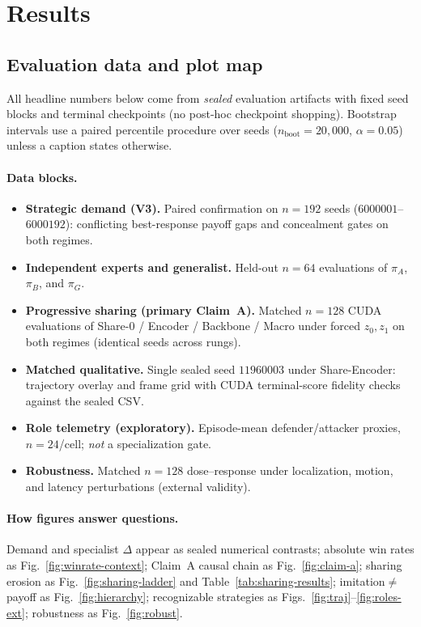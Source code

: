 \documentclass{article}
\begin{document}
\section{Results}
\label{sec:results}

\subsection{Evaluation data and plot map}
\label{sec:results-data}

All headline numbers below come from \emph{sealed} evaluation artifacts with
fixed seed blocks and terminal checkpoints (no post-hoc checkpoint shopping).
Bootstrap intervals use a paired percentile procedure over seeds
($n_{\mathrm{boot}}=20{,}000$, $\alpha=0.05$) unless a caption states otherwise.

\paragraph{Data blocks.}
\begin{itemize}
  \item \textbf{Strategic demand (V3).}
  Paired confirmation on $n{=}192$ seeds
  ($6000001$--$6000192$): conflicting best-response payoff gaps and concealment
  gates on both regimes.
  \item \textbf{Independent experts and generalist.}
  Held-out $n{=}64$ evaluations of $\pi_A$, $\pi_B$, and $\pi_G$.
  \item \textbf{Progressive sharing (primary Claim~A).}
  Matched $n{=}128$ CUDA evaluations of Share-0 / Encoder / Backbone / Macro
  under forced $z_0,z_1$ on both regimes (identical seeds across rungs).
  \item \textbf{Matched qualitative.}
  Single sealed seed $11960003$ under Share-Encoder: trajectory overlay and
  frame grid with CUDA terminal-score fidelity checks against the sealed CSV.
  \item \textbf{Role telemetry (exploratory).}
  Episode-mean defender/attacker proxies, $n{=}24$/cell; \emph{not} a
  specialization gate.
  \item \textbf{Robustness.}
  Matched $n{=}128$ dose--response under localization, motion, and latency
  perturbations (external validity).
\end{itemize}

\paragraph{How figures answer questions.}
Demand and specialist $\Delta$ appear as sealed numerical contrasts; absolute
win rates as Fig.~\ref{fig:winrate-context}; Claim~A causal chain as
Fig.~\ref{fig:claim-a}; sharing erosion as Fig.~\ref{fig:sharing-ladder} and
Table~\ref{tab:sharing-results}; imitation$\neq$payoff as
Fig.~\ref{fig:hierarchy}; recognizable strategies as
Figs.~\ref{fig:traj}--\ref{fig:roles-ext}; robustness as Fig.~\ref{fig:robust}.
\end{document}
